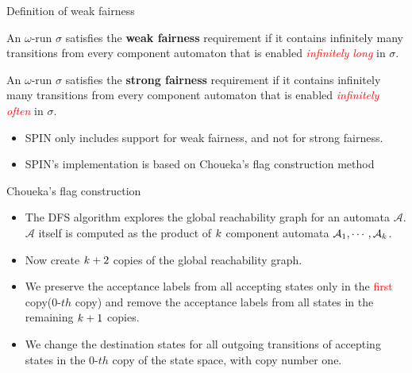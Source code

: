 \documentclass[12pt]{beamer}
\author{林宏陽}
\newcommand{\Automaton}{\mathcal{A}}
\newcommand{\kk}{\mathnormal{k}}
\begin{document}
\begin{frame}{Definition of weak fairness}
		\begin{definition}
			An $\omega$-run $\sigma$ satisfies the \textbf{weak fairness} requirement if it contains infinitely many transitions from every component automaton that is enabled \textcolor{red}{\textit{infinitely long}} in $\sigma$.
		\end{definition}
		\begin{definition}
			An $\omega$-run $\sigma$ satisfies the \textbf{strong fairness} requirement if it contains infinitely many transitions from every component automaton that is enabled \textcolor{red}{\textit{infinitely often}} in $\sigma$.
		\end{definition}
		\begin{itemize}
			\item SPIN only includes support for weak fairness, and not for strong fairness.
			\item SPIN's implementation is based on Choueka's flag construction method
		\end{itemize}
\end{frame}

\begin{frame}{Choueka's flag construction}
		\begin{itemize}
			\item The DFS algorithm explores the global reachability graph for an automata $\Automaton$. $\Automaton$ itself is computed as the product of $\kk$ component automata $\Automaton_{1}, \cdots, \Automaton_{\kk}$.
			\item Now create $\kk+2$ copies of the global reachability graph.
			\item We preserve the acceptance labels from all accepting states only in the \textcolor{red}{first} copy($0\text{-}th$ copy) and remove the acceptance labels from all states in the remaining $\kk+1$ copies.
			\item We change the destination states for all outgoing transitions of accepting states in the $0\text{-}th$ copy of the state space, with copy number one.
		\end{itemize}
\end{frame}
\end{document}
